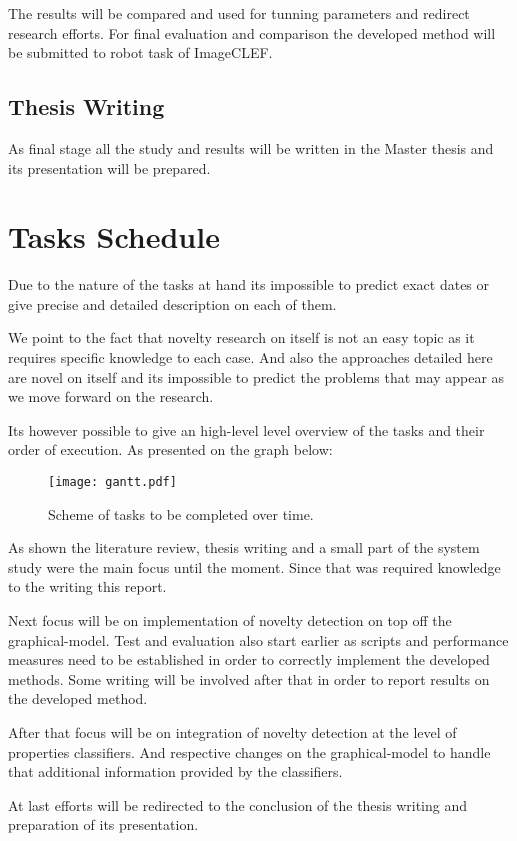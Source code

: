 The results will be compared and used for tunning parameters and redirect research efforts.
For final evaluation and comparison the developed method will be submitted to robot task of \gls{ImageCLEF}.

\subsection{Thesis Writing}
As final stage all the study and results will be written in the Master thesis and its presentation will be prepared.

\section{Tasks Schedule}
Due to the nature of the tasks at hand its impossible to predict exact dates or give precise and detailed description on each of them.

We point to the fact that novelty research on itself is not an easy topic as it requires specific knowledge to each case. And also the approaches detailed here are novel on itself and its impossible to predict the problems that may appear as we move forward on the research.

Its however possible to give an high-level level overview of the tasks and their order of execution.
As presented on the graph below:
\begin{figure}[!h]
\center
\texttt{[image: gantt.pdf]}
\caption{Scheme of tasks to be completed over time.}
\end{figure}

As shown the literature review, thesis writing and a small part of the system study were the main focus until the moment. Since that was required knowledge to the writing this report.

Next focus will be on implementation of novelty detection on top off the graphical-model. Test and evaluation also start earlier as scripts and performance measures need to be established in order to correctly implement the developed methods. Some writing will be involved after that in order to report results on the developed method.

After that focus will be on integration of novelty detection at the level of properties classifiers. And respective changes on the graphical-model to handle that additional information provided by the classifiers.

At last efforts will be redirected to the conclusion of the thesis writing and preparation of its presentation.

